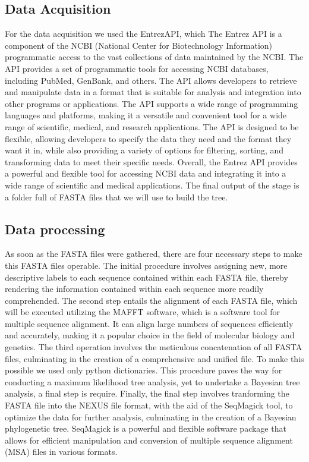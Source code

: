 \documentclass[12pt]{article}
\begin{document}
\subsection{Data Acquisition}
For the data acquisition we used the EntrezAPI, which The Entrez API is a component of the NCBI (National Center for Biotechnology Information) programmatic access to the vast collections of data maintained by the NCBI. The API provides a set of programmatic tools for accessing NCBI databases, including PubMed, GenBank, and others. The API allows developers to retrieve and manipulate data in a format that is suitable for analysis and integration into other programs or applications. The API supports a wide range of programming languages and platforms, making it a versatile and convenient tool for a wide range of scientific, medical, and research applications. The API is designed to be flexible, allowing developers to specify the data they need and the format they want it in, while also providing a variety of options for filtering, sorting, and transforming data to meet their specific needs. Overall, the Entrez API provides a powerful and flexible tool for accessing NCBI data and integrating it into a wide range of scientific and medical applications.\newline
The final output of the stage is a folder full of FASTA files that we will use to build the tree.
\subsection{Data processing}
As soon as the FASTA files were gathered, there are four necessary steps to make this FASTA files operable.\newline
The initial procedure involves assigning new, more descriptive labels to each sequence contained within each FASTA file, thereby rendering the information contained within each sequence more readily comprehended.\newline
The second step entails the alignment of each FASTA file, which will be executed utilizing the MAFFT software, which is a software tool for multiple sequence alignment. It can align large numbers of sequences efficiently and accurately, making it a popular choice in the field of molecular biology and genetics.\newline
The third operation involves the meticulous concatenation of all FASTA files, culminating in the creation of a comprehensive and unified file. To make this possible we used only python dictionaries. This procedure paves the way for conducting a maximum likelihood tree analysis, yet to undertake a Bayesian tree analysis, a final step is require.\newline
Finally, the final step involves tranforming the FASTA file into the NEXUS file format, with the aid of the SeqMagick tool, to optimize the data for further analysis, culminating in the creation of a Bayesian phylogenetic tree. SeqMagick is a powerful and flexible software package that allows for efficient manipulation and conversion of multiple sequence alignment (MSA) files in various formats.
\end{document}

